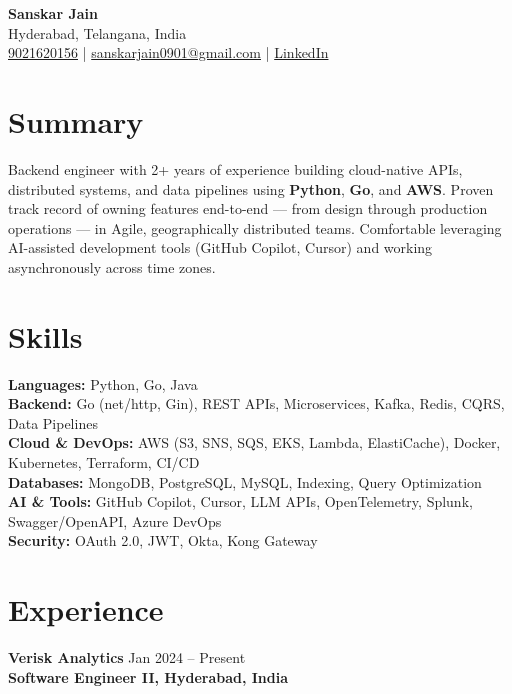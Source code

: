 \documentclass[a4paper,10pt]{article}
\begin{document}
\begin{center}
    {\LARGE \textbf{Sanskar Jain}} \\
    Hyderabad, Telangana, India \\
    \href{tel:9021620156}{9021620156} \;|\;
    \href{mailto:sanskarjain0901@gmail.com}{sanskarjain0901@gmail.com} \;|\;
    \href{https://www.linkedin.com/in/sanskar-jain0901/}{LinkedIn}
\end{center}

\vspace{3pt}

\section*{Summary}
Backend engineer with 2+ years of experience building cloud-native APIs, distributed systems, and data pipelines using \textbf{Python}, \textbf{Go}, and \textbf{AWS}.
Proven track record of owning features end-to-end --- from design through production operations --- in Agile, geographically distributed teams.
Comfortable leveraging AI-assisted development tools (GitHub Copilot, Cursor) and working asynchronously across time zones.

\section*{Skills}
\textbf{Languages:} Python, Go, Java \\
\textbf{Backend:} Go (net/http, Gin), REST APIs, Microservices, Kafka, Redis, CQRS, Data Pipelines \\
\textbf{Cloud \& DevOps:} AWS (S3, SNS, SQS, EKS, Lambda, ElastiCache), Docker, Kubernetes, Terraform, CI/CD \\
\textbf{Databases:} MongoDB, PostgreSQL, MySQL, Indexing, Query Optimization \\
\textbf{AI \& Tools:} GitHub Copilot, Cursor, LLM APIs, OpenTelemetry, Splunk, Swagger/OpenAPI, Azure DevOps \\
\textbf{Security:} OAuth 2.0, JWT, Okta, Kong Gateway

\section*{Experience}

\textbf{Verisk Analytics} \hfill Jan 2024 -- Present \\
\textbf{Software Engineer II, Hyderabad, India}
\end{document}
